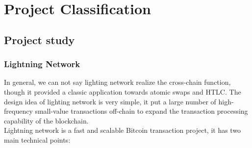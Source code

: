 \chapter{Project Classification} 
\label{chap:3}

  



\section{Project study}
\label{sec:ps}

\subsection{Lightning Network}
\noindent In general, we can not say lighting network realize the cross-chain function, though it provided a classic application towards atomic swaps and HTLC. The design idea of lighting network is very simple, it put a large number of high-frequency small-value transactions off-chain to expand the transaction processing capability of the blockchain.\\
\noindent Lightning network\cite{poon2016bitcoin} is a fast and scalable Bitcoin transaction project, it has two main technical points:
